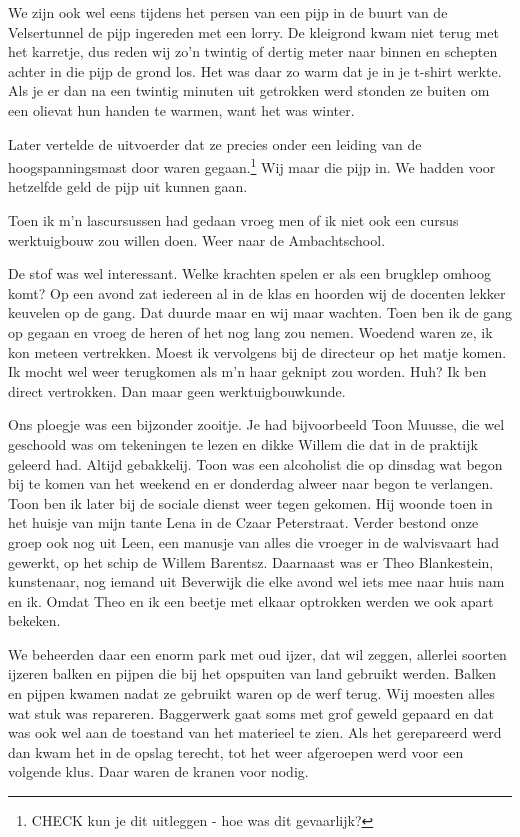 \documentclass[12pt,twoside, openright]{memoir}
\begin{document}
We zijn ook wel eens tijdens het persen van een pijp in de buurt van de Velsertunnel de pijp ingereden met een lorry. De kleigrond kwam niet terug met het karretje, dus reden wij zo'n twintig of dertig meter naar binnen en schepten achter in die pijp de grond los. Het was daar zo warm dat je in je t-shirt werkte. Als je er dan na een twintig minuten uit getrokken werd stonden ze buiten om een olievat hun handen te warmen, want het was winter. 

Later vertelde de uitvoerder dat ze precies onder een leiding van de hoogspanningsmast door waren gegaan.\footnote{CHECK kun je dit uitleggen - hoe was dit gevaarlijk?} Wij maar die pijp in. We hadden voor hetzelfde geld de pijp uit kunnen gaan.

Toen ik m’n lascursussen had gedaan vroeg men of ik niet ook een cursus werktuigbouw zou willen doen. Weer naar de Ambachtschool. 

De stof was wel interessant. Welke krachten spelen er als een brugklep omhoog komt? Op een avond zat iedereen al in de klas en hoorden wij de docenten lekker keuvelen op de gang. Dat duurde maar en wij maar wachten. Toen ben ik de gang op gegaan en vroeg de heren of het nog lang zou nemen. Woedend waren ze, ik kon meteen vertrekken. Moest ik vervolgens bij de directeur op het matje komen. Ik mocht wel weer terugkomen als m’n haar geknipt zou worden. Huh? Ik ben direct vertrokken. Dan maar geen werktuigbouwkunde.

Ons ploegje was een bijzonder zooitje. Je had bijvoorbeeld Toon Muusse, die wel geschoold was om tekeningen te lezen en dikke Willem die dat in de praktijk geleerd had. Altijd gebakkelij. Toon was een alcoholist die op dinsdag wat begon bij te komen van het weekend en er donderdag alweer naar begon te verlangen. Toon ben ik later bij de sociale dienst weer tegen gekomen. Hij woonde toen in het huisje van mijn tante Lena in de Czaar Peterstraat. Verder bestond onze groep ook nog uit Leen, een manusje van alles die vroeger in de walvisvaart had gewerkt, op het schip de Willem Barentsz. Daarnaast was er Theo Blankestein, kunstenaar, nog iemand uit Beverwijk die elke avond wel iets mee naar huis nam en ik. Omdat Theo en ik een beetje met elkaar optrokken werden we ook apart bekeken. 

We beheerden daar een enorm park met oud ijzer, dat wil zeggen, allerlei soorten ijzeren balken en pijpen die bij het opspuiten van land gebruikt werden. Balken en pijpen kwamen nadat ze gebruikt waren op de werf terug. Wij moesten alles wat stuk was repareren. Baggerwerk gaat soms met grof geweld gepaard en dat was ook wel aan de toestand van het materieel te zien. Als het gerepareerd werd dan kwam het in de opslag terecht, tot het weer afgeroepen werd voor een volgende klus. Daar waren de kranen voor nodig. 
\end{document}
